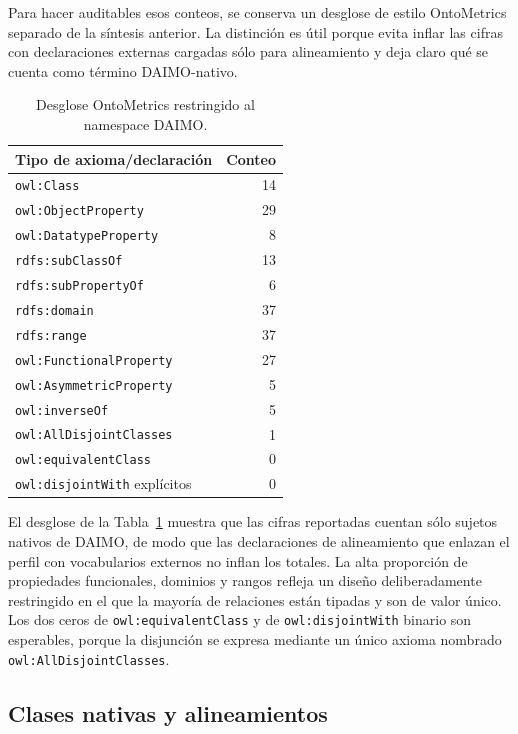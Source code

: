 \documentclass[Afour,sagev,times]{sagej}
\newcommand{\code}[1]{\texttt{#1}}
\begin{document}
Para hacer auditables esos conteos, se conserva un desglose de estilo OntoMetrics separado de la síntesis anterior. La distinción es útil porque evita inflar las cifras con declaraciones externas cargadas sólo para alineamiento y deja claro qué se cuenta como término DAIMO-nativo.

\begin{table}[tb]
\small\sf\centering
\caption{Desglose OntoMetrics restringido al namespace DAIMO.\label{tab:ontometrics}}
\begin{tabular}{@{}p{5.2cm}r@{}}
\toprule
\textbf{Tipo de axioma/declaración} & \textbf{Conteo} \\
\midrule
\code{owl:Class} & 14 \\
\code{owl:ObjectProperty} & 29 \\
\code{owl:DatatypeProperty} & 8 \\
\code{rdfs:subClassOf} & 13 \\
\code{rdfs:subPropertyOf} & 6 \\
\code{rdfs:domain} & 37 \\
\code{rdfs:range} & 37 \\
\code{owl:FunctionalProperty} & 27 \\
\code{owl:AsymmetricProperty} & 5 \\
\code{owl:inverseOf} & 5 \\
\code{owl:AllDisjointClasses} & 1 \\
\code{owl:equivalentClass} & 0 \\
\code{owl:disjointWith} explícitos & 0 \\
\bottomrule
\end{tabular}
\end{table}

El desglose de la Tabla~\ref{tab:ontometrics} muestra que las cifras reportadas cuentan sólo sujetos nativos de DAIMO, de modo que las declaraciones de alineamiento que enlazan el perfil con vocabularios externos no inflan los totales. La alta proporción de propiedades funcionales, dominios y rangos refleja un diseño deliberadamente restringido en el que la mayoría de relaciones están tipadas y son de valor único. Los dos ceros de \code{owl:equivalentClass} y de \code{owl:disjointWith} binario son esperables, porque la disjunción se expresa mediante un único axioma nombrado \code{owl:AllDisjointClasses}.

\subsection{Clases nativas y alineamientos}\label{sec:classes}
\end{document}
